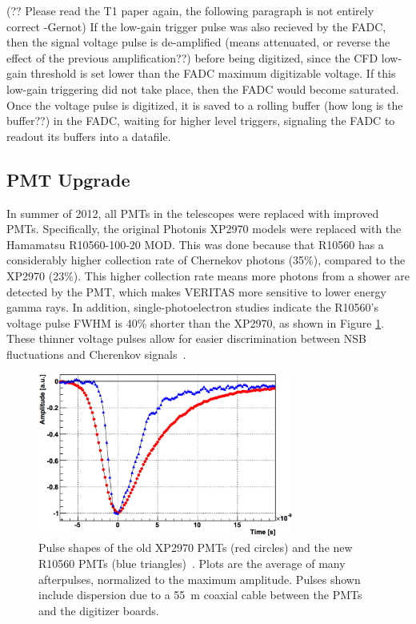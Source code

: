 {\color{red}(?? Please read the T1 paper again, the following paragraph is not entirely correct -Gernot)}
If the low-gain trigger pulse was also recieved by the FADC, then the signal voltage pulse is de-amplified {\color{red}(means attenuated, or reverse the effect of the previous amplification??)} before being digitized, since the CFD low-gain threshold is set lower than the FADC maximum digitizable voltage.
If this low-gain triggering did not take place, then the FADC would become saturated.
Once the voltage pulse is digitized, it is saved to a rolling buffer {\color{red}(how long is the buffer??)} in the FADC, waiting for higher level triggers, signaling the FADC to readout its buffers into a datafile.

\subsection{PMT Upgrade}
In summer of 2012, all PMTs in the telescopes were replaced with improved PMTs.
Specifically, the original Photonis XP2970 models were replaced with the Hamamatsu R10560-100-20 MOD.
This was done because that R10560 has a considerably higher collection rate of Chernekov photons (35\%), compared to the XP2970 (23\%).
This higher collection rate means more photons from a shower are detected by the PMT, which makes VERITAS more sensitive to lower energy gamma rays.
In addition, single-photoelectron studies indicate the R10560's voltage pulse FWHM is \nicetilde{}40\% shorter than the XP2970, as shown in Figure \ref{fig:pmt_pulse_widths}.
These thinner voltage pulses allow for easier discrimination between NSB fluctuations and Cherenkov signals~\cite{pmtmodels}.

\begin{figure}[ht]
  \centering
  \includegraphics[width=0.75\textwidth]{images/pmt_models_pulsewidths.eps}
  \caption[Pulse Shapes]{
    Pulse shapes of the old XP2970 PMTs (red circles) and the new R10560 PMTs (blue triangles)~\cite{pmtmodels}.
    Plots are the average of many afterpulses, normalized to the maximum amplitude.
    Pulses shown include dispersion due to a \nicetilde{}\SI{55}{m} coaxial cable between the PMTs and the digitizer boards.}
  \label{fig:pmt_pulse_widths}
\end{figure}

